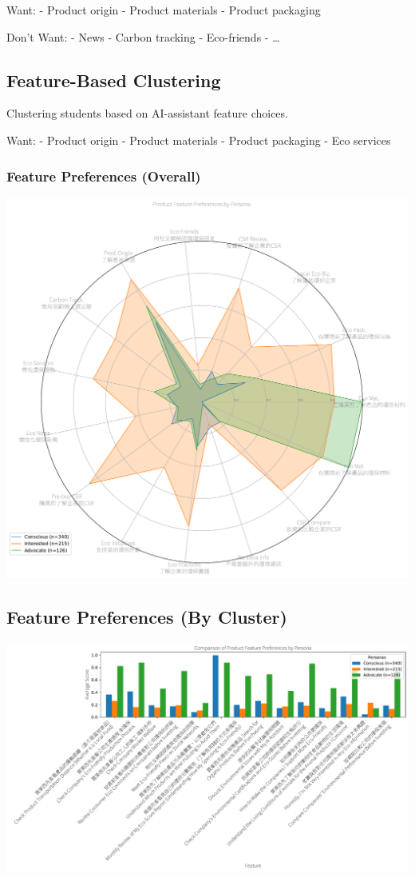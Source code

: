 \documentclass[
  letterpaper,
  DIV=11,
  numbers=noendperiod]{scrartcl}
\begin{document}
Want: - Product origin - Product materials - Product packaging

Don't Want: - News - Carbon tracking - Eco-friends - \ldots{}

\subsection{Feature-Based Clustering}\label{feature-based-clustering}

Clustering students based on AI-assistant feature choices.

Want: - Product origin - Product materials - Product packaging - Eco
services

\subsubsection{Feature Preferences
(Overall)}\label{feature-preferences-overall}

\includegraphics{_thesis_files/figure-pdf/cell-87-output-1.pdf}

\subsection{Feature Preferences (By
Cluster)}\label{feature-preferences-by-cluster}

\includegraphics{_thesis_files/figure-pdf/cell-88-output-1.pdf}
\end{document}
